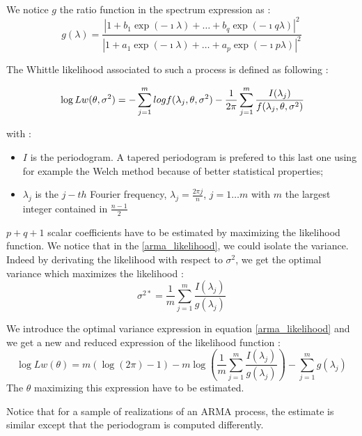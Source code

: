 We notice $g$ the ratio function in the spectrum expression as :
\begin{equation*}
g(\lambda) = \frac{|1 + b_1 \exp(-\imath \lambda) + \ldots + b_q \exp(-\imath q \lambda)|^2}{|1 + a_1 \exp(-\imath \lambda) + \ldots + a_p \exp(-\imath p \lambda)|^2}
\end{equation*}

The Whittle likelihood associated to such a process is defined as following :

\begin{equation}{\label{arma_likelihood}}
\log Lw(\theta, \sigma^2) = - \sum_{j=1}^{m} log f(\lambda_j,  \theta, \sigma^2) - \frac{1}{2 \pi} \sum_{j=1}^{m} \frac{I(\lambda_j)}{f(\lambda_j,  \theta, \sigma^2)}
\end{equation}

with :
\begin{itemize}
\item $I$ is the periodogram. A tapered periodogram is prefered to this last one using for example the Welch method because of better statistical properties;
\item $\lambda_j$ is the $j-th$ Fourier frequency, $\lambda_j = \frac{2 \pi j}{n}$, $j=1 \ldots m$ with $m$ the largest integer contained in $\frac{n-1}{2}$
\end{itemize}

$p+q+1$ scalar coefficients have to be estimated by maximizing the likelihood function. We notice that in the \ref{arma_likelihood}, we could isolate the variance.
Indeed by derivating the likelihood with respect to $\sigma^2$, we get the optimal variance which maximizes the likelihood :
\begin{equation*}
\sigma^{2*} = \frac{1}{m} \sum_{j=1}^{m} \frac{I(\lambda_j)}{g(\lambda_j)}
\end{equation*}

We introduce the optimal variance expression in equation \ref{arma_likelihood} and we get a new and reduced expression of the likelihood function :
\begin{equation*}
\log Lw(\theta) = m (\log(2 \pi) - 1) - m \log\left( \frac{1}{m} \sum_{j=1}^{m} \frac{I(\lambda_j)}{g(\lambda_j)}\right) - \sum_{j=1}^{m} g(\lambda_j)
\end{equation*}
The $\theta$ maximizing this expression have to be estimated. 

Notice that for a sample of realizations of an ARMA process, the estimate is similar except that the periodogram is computed differently. \\ \\

